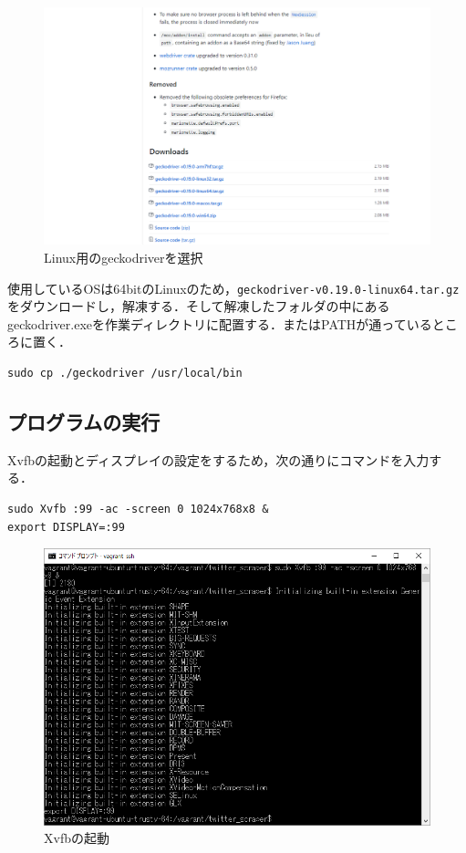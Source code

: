 \newpage
\begin{figure}[htb]
\centering
\includegraphics[width=13cm]{img/driver1.png}
\caption{Linux用のgeckodriverを選択}
\end{figure}
使用しているOSは64bitのLinuxのため，\texttt{geckodriver-v0.19.0-linux64.tar.gz}をダウンロードし，解凍する．そして解凍したフォルダの中にあるgeckodriver.exeを作業ディレクトリに配置する．またはPATHが通っているところに置く．
\begin{lstlisting}[basicstyle=\ttfamily\footnotesize, frame=single]
sudo cp ./geckodriver /usr/local/bin
\end{lstlisting}

\newpage

\subsection{プログラムの実行}
Xvfbの起動とディスプレイの設定をするため，次の通りにコマンドを入力する．
\begin{lstlisting}[basicstyle=\ttfamily\footnotesize, frame=single]
sudo Xvfb :99 -ac -screen 0 1024x768x8 &
export DISPLAY=:99
\end{lstlisting}
\begin{figure}[htb]
\centering
\includegraphics[width=13cm]{img/xvfb.png}
\caption{Xvfbの起動}
\end{figure}

